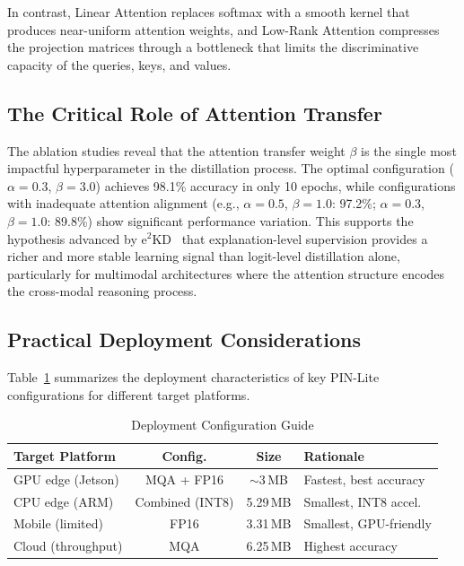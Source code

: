 \documentclass[lettersize,journal]{IEEEtran}
\begin{document}
In contrast, Linear Attention replaces softmax with a smooth kernel that produces near-uniform attention weights, and Low-Rank Attention compresses the projection matrices through a bottleneck that limits the discriminative capacity of the queries, keys, and values.

\subsection{The Critical Role of Attention Transfer}

The ablation studies reveal that the attention transfer weight $\beta$ is the single most impactful hyperparameter in the distillation process. The optimal configuration ($\alpha = 0.3$, $\beta = 3.0$) achieves 98.1\% accuracy in only 10 epochs, while configurations with inadequate attention alignment (e.g., $\alpha = 0.5$, $\beta = 1.0$: 97.2\%; $\alpha = 0.3$, $\beta = 1.0$: 89.8\%) show significant performance variation. This supports the hypothesis advanced by e$^2$KD~\cite{parchami2024e2kd} that explanation-level supervision provides a richer and more stable learning signal than logit-level distillation alone, particularly for multimodal architectures where the attention structure encodes the cross-modal reasoning process.

\subsection{Practical Deployment Considerations}

Table~\ref{tab:deployment} summarizes the deployment characteristics of key PIN-Lite configurations for different target platforms.

\begin{table}[!t]
\caption{Deployment Configuration Guide\label{tab:deployment}}
\centering
\footnotesize
\begin{tabular}{lccl}
\toprule
\textbf{Target Platform} & \textbf{Config.} & \textbf{Size} & \textbf{Rationale} \\
\midrule
GPU edge (Jetson) & MQA + FP16 & $\sim$3\,MB & Fastest, best accuracy \\
CPU edge (ARM) & Combined (INT8) & 5.29\,MB & Smallest, INT8 accel. \\
Mobile (limited) & FP16 & 3.31\,MB & Smallest, GPU-friendly \\
Cloud (throughput) & MQA & 6.25\,MB & Highest accuracy \\
\bottomrule
\end{tabular}
\end{table}
\end{document}
